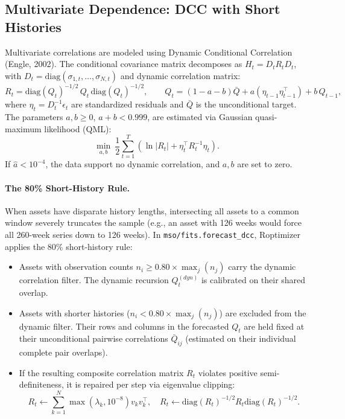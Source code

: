 \documentclass[11pt]{article}
\begin{document}
\subsection{Multivariate Dependence: DCC with Short Histories}
Multivariate correlations are modeled using Dynamic Conditional Correlation (Engle, 2002).
The conditional covariance matrix decomposes as $H_t = D_t R_t D_t$, with $D_t = \mathrm{diag}(\sigma_{1,t},\dots,\sigma_{N,t})$
and dynamic correlation matrix:
\begin{equation}
R_t = \mathrm{diag}(Q_t)^{-1/2}\,Q_t\,\mathrm{diag}(Q_t)^{-1/2}, \qquad
Q_t = (1-a-b)\bar{Q} + a(\eta_{t-1}\eta_{t-1}^{\top}) + b\,Q_{t-1},
\end{equation}
where $\eta_t = D_t^{-1}\epsilon_t$ are standardized residuals and $\bar{Q}$ is the unconditional target.
The parameters $a, b \ge 0$, $a+b < 0.999$, are estimated via Gaussian quasi-maximum likelihood (QML):
\begin{equation}
\min_{a, b}\ \frac{1}{2}\sum_{t=1}^T \left(\ln|R_t| + \eta_t^{\top} R_t^{-1} \eta_t\right).
\end{equation}
If $\hat{a} < 10^{-4}$, the data support no dynamic correlation, and $a, b$ are set to zero.

\paragraph{The 80\% Short-History Rule.}
When assets have disparate history lengths, intersecting all assets to a common window severely truncates the
sample (e.g., an asset with 126 weeks would force all 260-week series down to 126 weeks).
In \texttt{mso/fits.forecast\_dcc}, Roptimizer applies the 80\% short-history rule:
\begin{itemize}[nosep]
\item Assets with observation counts $n_i \ge 0.80 \times \max_j(n_j)$ carry the dynamic correlation filter.
The dynamic recursion $Q_t^{(dyn)}$ is calibrated on their shared overlap.
\item Assets with shorter histories ($n_i < 0.80 \times \max_j(n_j)$) are excluded from the dynamic filter.
Their rows and columns in the forecasted $Q_t$ are held fixed at their unconditional pairwise correlations
$\bar{Q}_{ij}$ (estimated on their individual complete pair overlaps).
\item If the resulting composite correlation matrix $R_t$ violates positive semi-definiteness, it is repaired
per step via eigenvalue clipping:
\begin{equation}
R_t \leftarrow \sum_{k=1}^N \max(\lambda_k, 10^{-8}) v_k v_k^{\top}, \quad
R_t \leftarrow \mathrm{diag}(R_t)^{-1/2} R_t \mathrm{diag}(R_t)^{-1/2}.
\end{equation}
\end{itemize}
\end{document}
